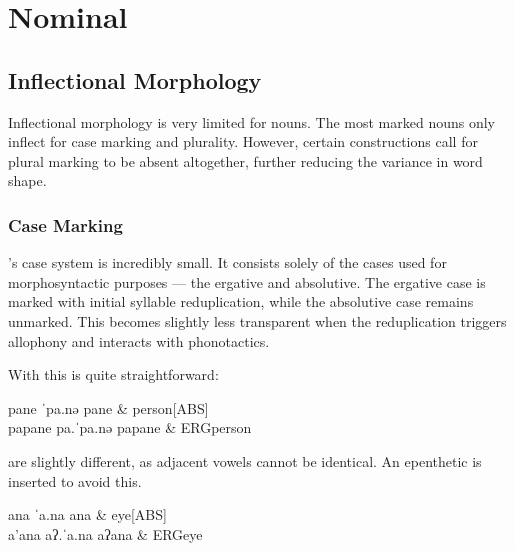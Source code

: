 \chapter{Nominal}\label{ch:morpho-nom}
\section{Inflectional Morphology}\label{sec:morpho-nom-inf}
Inflectional morphology is very limited for nouns. The most marked nouns only inflect for case marking and plurality. However, certain constructions call for plural marking to be absent altogether, further reducing the variance in word shape.

\subsection{Case Marking}\label{sec:case-marking}
\langname 's case system is incredibly small. It consists solely of the cases used for morphosyntactic purposes --- the ergative and absolutive. The ergative case is marked with initial syllable reduplication, while the absolutive case remains unmarked. This becomes slightly less transparent when the reduplication triggers allophony and interacts with phonotactics.


With  this is quite straightforward:

\begin{subexamples}
  \ex
    \preamble pane
    \pronunciation ˈpa.nə
    \gloss
      pane & person[ABS] \\
  \ex
    \preamble papane
    \pronunciation pa.ˈpa.nə
    \gloss
      pa\allo pane & ERG\allo person \\
\end{subexamples}

 are slightly different, as adjacent vowels cannot be identical. An epenthetic  is inserted to avoid this.

\begin{subexamples}
  \ex
    \preamble ana
    \pronunciation ˈa.na
    \gloss
      ana & eye[ABS] \\
  \ex
    \preamble a'ana
    \pronunciation aʔ.ˈa.na
    \gloss
      aʔ\allo ana & ERG\allo eye \\
\end{subexamples}

